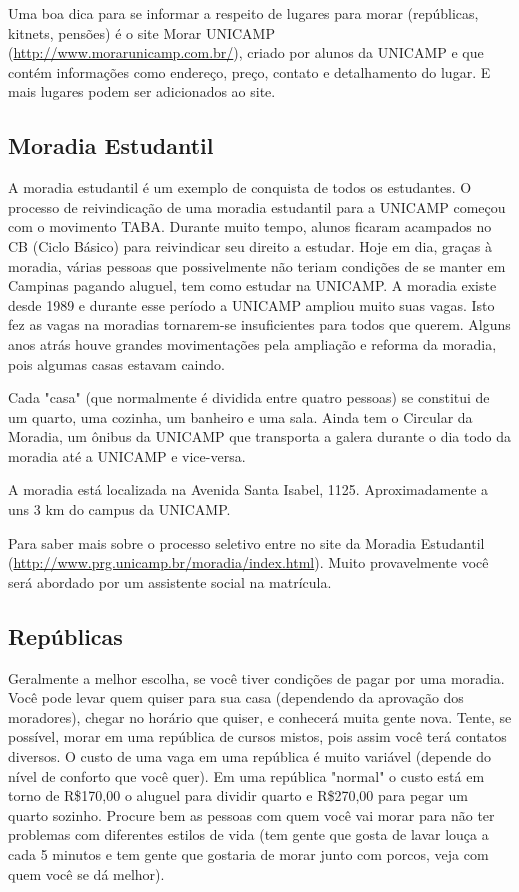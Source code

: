 Uma boa dica para se informar a respeito de lugares para morar (repúblicas,
kitnets, pensões) é o site Morar UNICAMP
(\url{http://www.morarunicamp.com.br/}), criado por alunos da UNICAMP e que
contém informações como endereço, preço, contato e detalhamento do lugar. E mais
lugares podem ser adicionados ao site.

\subsection{Moradia Estudantil}
A moradia estudantil é um exemplo de conquista de todos os estudantes.
O processo de reivindicação de uma moradia estudantil para a UNICAMP começou com
o movimento TABA. Durante muito tempo, alunos ficaram acampados no CB (Ciclo
Básico) para reivindicar seu direito a estudar. Hoje em dia, graças à moradia,
várias pessoas que possivelmente não teriam condições de se manter em Campinas
pagando aluguel, tem como estudar na UNICAMP. A moradia existe desde 1989
e durante esse período a UNICAMP ampliou muito suas vagas. Isto fez as vagas na
moradias tornarem-se insuficientes para todos que querem. Alguns anos atrás
houve grandes movimentações pela ampliação e reforma da moradia, pois algumas
casas estavam caindo. 

Cada "casa" (que normalmente é dividida entre quatro pessoas) se constitui de um
quarto, uma cozinha, um banheiro e uma sala. Ainda tem o Circular da Moradia, um
ônibus da UNICAMP que transporta a galera durante o dia todo da moradia até
a UNICAMP e vice-versa.

A moradia está localizada na Avenida Santa Isabel, 1125. Aproximadamente a uns
3 km do campus da UNICAMP.

Para saber mais sobre o processo seletivo entre no site da Moradia Estudantil
(\url{http://www.prg.unicamp.br/moradia/index.html}). Muito provavelmente você
será abordado por um assistente social na matrícula.

\subsection{Repúblicas}
Geralmente a melhor escolha, se você tiver condições de pagar por uma moradia.
Você pode levar quem quiser para sua casa (dependendo da aprovação dos
moradores), chegar no horário que quiser, e conhecerá muita gente nova. Tente,
se possível, morar em uma república de cursos mistos, pois assim você terá
contatos diversos. O custo de uma vaga em uma república é muito variável
(depende do nível de conforto que você quer). Em uma república "normal" o custo
está em torno de R\$170,00 o aluguel para dividir quarto e R\$270,00 para pegar
um quarto sozinho. Procure bem as pessoas com quem você vai morar para não ter
problemas com diferentes estilos de vida (tem gente que gosta de lavar louça
a cada 5 minutos e tem gente que gostaria de morar junto com porcos, veja com
quem você se dá melhor).


